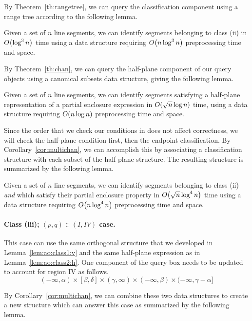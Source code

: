 By Theorem~\ref{th:rangetree}, we can query the classification component using a range tree according to the following lemma.
\begin{lemma}
\label{lem:ao:class2:v}
Given a set of $n$ line segments, we can identify segments belonging to class (ii) in $O\!\left(\log^3{n}\right)$ time using a data structure requiring $O\!\left(n\log^3{n}\right)$ preprocessing time and space.
\end{lemma}

By Theorem~\ref{th:chan}, we can query the half-plane component of our query objects using a canonical subsets data structure, giving the following lemma.

\begin{lemma}
\label{lem:ao:class2:h}
Given a set of $n$ line segments, we can identify segments satisfying a half-plane representation of a partial enclosure expression in $O\!\left(\sqrt{n}\log{n}\right)$ time, using a data structure requiring $O\!\left(n\log{n}\right)$ preprocessing time and space.
\end{lemma}

Since the order that we check our conditions in does not affect correctness, we will check the half-plane condition first, then the endpoint classification.  
By Corollary~\ref{cor:multichan}, we can accomplish this by associating a classification structure with each subset of the half-plane structure. The resulting structure is summarized by the following lemma.

\begin{lemma}
\label{lem:ao:class2:c}
Given a set of $n$ line segments, we can identify segments belonging to class (ii) \emph{and} which satisfy their partial enclosure property in $O\!\left(\sqrt{n}\log^4{n}\right)$ time using a data structure requiring $O\!\left(n\log^4{n}\right)$ preprocessing time and space.
\end{lemma}


\paragraph{Class (iii); $(p, q) \in (I, IV)$ case.} 
This case can use the same orthogonal structure that we developed in Lemma~\ref{lem:ao:class1:v} and the same half-plane expression as in Lemma~\ref{lem:ao:class2:h}. 
One component of the query box needs to be updated to account for region IV as follows.
\[
(-\infty, \alpha) \times [\beta, \delta] \times (\gamma, \infty) \times (-\infty, \beta) \times (-\infty, \gamma - \alpha]
\]

By Corollary~\ref{cor:multichan}, we can combine these two data structures to create a new structure which can answer this case as summarized by the following lemma.

